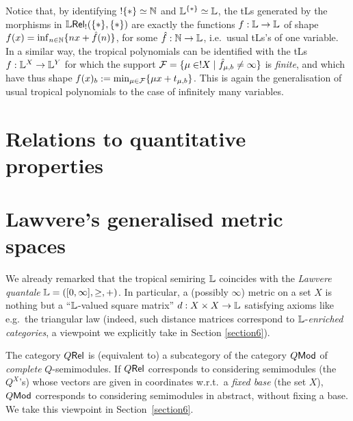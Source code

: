 \documentclass[submission,%
]{eptcs}
\begin{document}
Notice that, by identifying $!\{*\}\simeq \mathbb{N}$ and $\mathbb{L}^{\{*\}}\simeq\mathbb{L}$, the tLs generated by the morphisms in ${\mathbb{L} \mathsf{Rel}_!}(\{*\},\{*\})$ are exactly the functions $f:\mathbb{L}\to\mathbb{L}$ of shape $f(x)=\inf_{n\in\mathbb{N}}\{nx+\hat{f}(n)\}$, for some $\hat{f}:\mathbb{N}\to\mathbb{L}$, i.e.\ usual tLs's of one variable.
In a similar way, the tropical polynomials can be identified with the tLs
$f:\mathbb{L}^X\to\mathbb{L}^Y$ 
 for which the support $\mathcal{F}=\{\mu\in!X\mid\hat{f}_{\mu,b}\neq\infty\}$ is \emph{finite}, and which have thus shape $f(x)_b:=\min_{\mu\in\mathcal{F}} \{\mu x+ t_{\mu,b}\}$.
 This is again the generalisation of usual tropical polynomials to the case of infinitely many variables.


\section{Relations to quantitative properties}



\section{Lawvere's generalised metric spaces}

We already remarked that the tropical semiring $\mathbb{L}$ coincides with the \emph{Lawvere quantale} $\mathbb{L}=([0,\infty], \geq, +)$.
In particular, a (possibly $\infty$) metric on a set $X$ is nothing but a ``$\mathbb{L}$-valued square matrix'' $d:X\times X\to \mathbb{L}$ satisfying axioms like e.g.~the triangular law (indeed, such distance matrices correspond to $\mathbb{L}$-\emph{enriched categories}, a viewpoint we explicitly take in Section \ref{section6}). 

\begin{remark}
 The category $Q \mathsf{Rel}$ is (equivalent to) a subcategory of the category $Q\mathsf{Mod}$ of \emph{complete} $Q$-semimodules.
 If $Q \mathsf{Rel}$ corresponds to considering semimodules (the $Q^X$'s) whose vectors are given in coordinates w.r.t.\ a \emph{fixed base} (the set $X$), $Q\mathsf{Mod}$ corresponds to considering semimodules in abstract, without fixing a base.
 We take this viewpoint in Section~\ref{section6}.
\end{remark}
\end{document}
